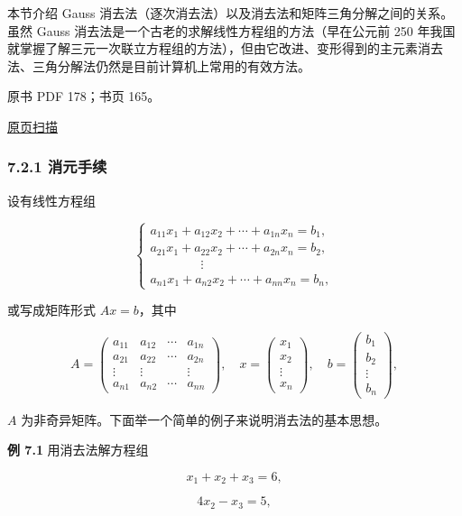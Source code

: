 \documentclass[
  10pt,
  fontset=fandol]{ctexart}
\begin{document}
本节介绍 Gauss 消去法（逐次消去法）以及消去法和矩阵三角分解之间的关系。虽然 Gauss 消去法是一个古老的求解线性方程组的方法（早在公元前 250 年我国就掌握了解三元一次联立方程组的方法），但由它改进、变形得到的主元素消去法、三角分解法仍然是目前计算机上常用的有效方法。

\clearpage

原书 PDF 178；书页 165。

\href{/Users/xiangjunfeng/Desktop/数值计算专用/numerical-analysis/book/source-images/pdf-178.jpeg}{原页扫描}

\subsubsection{7.2.1 消元手续}\label{ux6d88ux5143ux624bux7eed}

设有线性方程组

\[
\begin{cases}
a_{11}x_1+a_{12}x_2+\cdots+a_{1n}x_n=b_1,\\
a_{21}x_1+a_{22}x_2+\cdots+a_{2n}x_n=b_2,\\
\qquad\qquad\vdots\\
a_{n1}x_1+a_{n2}x_2+\cdots+a_{nn}x_n=b_n,
\end{cases}
\tag{7.2.1}
\]

或写成矩阵形式 \(Ax=b\)，其中

\[
A=\begin{pmatrix}
a_{11}&a_{12}&\cdots&a_{1n}\\
a_{21}&a_{22}&\cdots&a_{2n}\\
\vdots&\vdots&&\vdots\\
a_{n1}&a_{n2}&\cdots&a_{nn}
\end{pmatrix},\quad
x=\begin{pmatrix}x_1\\x_2\\\vdots\\x_n\end{pmatrix},\quad
b=\begin{pmatrix}b_1\\b_2\\\vdots\\b_n\end{pmatrix},
\]

\(A\) 为非奇异矩阵。下面举一个简单的例子来说明消去法的基本思想。

\textbf{例 7.1} 用消去法解方程组

\[x_1+x_2+x_3=6,\tag{7.2.2}\]

\[4x_2-x_3=5,\tag{7.2.3}\]
\end{document}
